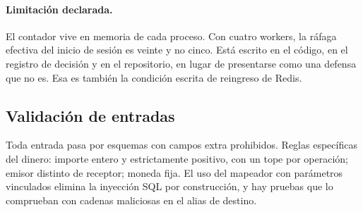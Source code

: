 \paragraph{Limitación declarada.} El contador vive en memoria de cada proceso.
Con cuatro workers, la ráfaga efectiva del inicio de sesión es veinte y no
cinco. Está escrito en el código, en el registro de decisión y en el
repositorio, en lugar de presentarse como una defensa que no es. Esa es
también la condición escrita de reingreso de Redis.

\subsection{Validación de entradas}

Toda entrada pasa por esquemas con campos extra prohibidos. Reglas específicas
del dinero: importe entero y estrictamente positivo, con un tope por
operación; emisor distinto de receptor; moneda fija. El uso del mapeador con
parámetros vinculados elimina la inyección SQL por construcción, y hay pruebas
que lo comprueban con cadenas maliciosas en el alias de destino.
